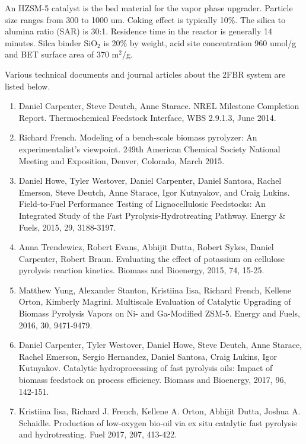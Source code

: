 An HZSM-5 catalyst is the bed material for the vapor phase upgrader. Particle size ranges from 300 to 1000 um. Coking effect is typically 10\%. The silica to alumina ratio (SAR) is 30:1. Residence time in the reactor is generally 14 minutes. Silca binder SiO$_2$ is 20\% by weight, acid site concentration 960 umol/g and BET surface area of 370 m$^2$/g.

Various technical documents and journal articles about the 2FBR system are listed below.

\begin{enumerate}
    \item Daniel Carpenter, Steve Deutch, Anne Starace. NREL Milestone Completion Report. Thermochemical Feedstock Interface, WBS 2.9.1.3, June 2014.
    \item Richard French. Modeling of a bench-scale biomass pyrolyzer: An experimentalist’s viewpoint. 249th American Chemical Society National Meeting and Exposition, Denver, Colorado, March 2015.
    \item Daniel Howe, Tyler Westover, Daniel Carpenter, Daniel Santosa, Rachel Emerson, Steve Deutch, Anne Starace, Igor Kutnyakov, and Craig Lukins. Field-to-Fuel Performance Testing of Lignocellulosic Feedstocks: An Integrated Study of the Fast Pyrolysis-Hydrotreating Pathway. Energy \& Fuels, 2015, 29, 3188-3197.
    \item Anna Trendewicz, Robert Evans, Abhijit Dutta, Robert Sykes, Daniel Carpenter, Robert Braun. Evaluating the effect of potassium on cellulose pyrolysis reaction kinetics. Biomass and Bioenergy, 2015, 74, 15-25.
    \item Matthew Yung, Alexander Stanton, Kristiina Iisa, Richard French, Kellene Orton, Kimberly Magrini. Multiscale Evaluation of Catalytic Upgrading of Biomass Pyrolysis Vapors on Ni- and Ga-Modified ZSM-5. Energy and Fuels, 2016, 30, 9471-9479.
    \item Daniel Carpenter, Tyler Westover, Daniel Howe, Steve Deutch, Anne Starace, Rachel Emerson, Sergio Hernandez, Daniel Santosa, Craig Lukins, Igor Kutnyakov. Catalytic hydroprocessing of fast pyrolysis oils: Impact of biomass feedstock on process efficiency. Biomass and Bioenergy, 2017, 96, 142-151.
    \item Kristiina Iisa, Richard J. French, Kellene A. Orton, Abhijit Dutta, Joshua A. Schaidle. Production of low-oxygen bio-oil via ex situ catalytic fast pyrolysis and hydrotreating. Fuel 2017, 207, 413-422.
\end{enumerate}
